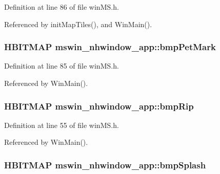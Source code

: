 Definition at line 86 of file win\+M\+S.\+h.



Referenced by init\+Map\+Tiles(), and Win\+Main().

\hypertarget{structmswin__nhwindow__app_a786a513972fdf914ae95bcbf5c702ead}{
\subsubsection[{bmp\+Pet\+Mark}]{\setlength{\rightskip}{0pt plus 5cm}H\+B\+I\+T\+M\+A\+P mswin\+\_\+nhwindow\+\_\+app\+::bmp\+Pet\+Mark}}\label{structmswin__nhwindow__app_a786a513972fdf914ae95bcbf5c702ead}


Definition at line 85 of file win\+M\+S.\+h.



Referenced by Win\+Main().

\hypertarget{structmswin__nhwindow__app_a999ca1b8a326d75bf29ede7b2cbeb205}{
\subsubsection[{bmp\+Rip}]{\setlength{\rightskip}{0pt plus 5cm}H\+B\+I\+T\+M\+A\+P mswin\+\_\+nhwindow\+\_\+app\+::bmp\+Rip}}\label{structmswin__nhwindow__app_a999ca1b8a326d75bf29ede7b2cbeb205}


Definition at line 55 of file win\+M\+S.\+h.



Referenced by Win\+Main().

\hypertarget{structmswin__nhwindow__app_ae46760e977e06676139a68adec0d2648}{
\subsubsection[{bmp\+Splash}]{\setlength{\rightskip}{0pt plus 5cm}H\+B\+I\+T\+M\+A\+P mswin\+\_\+nhwindow\+\_\+app\+::bmp\+Splash}}\label{structmswin__nhwindow__app_ae46760e977e06676139a68adec0d2648}


